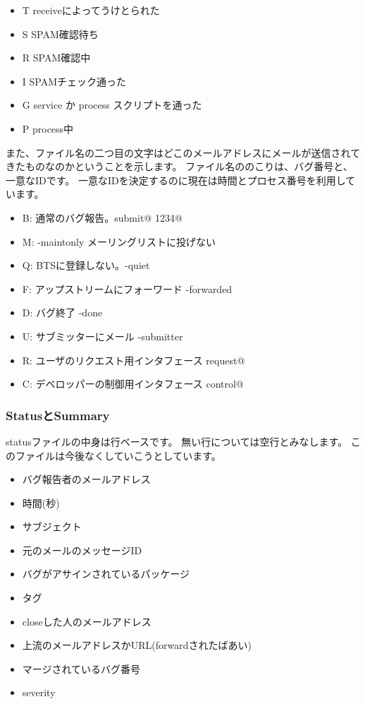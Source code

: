 \documentclass[mingoth,a4paper]{jsarticle}
\begin{document}
\begin{itemize}
 \item T receiveによってうけとられた
 \item S SPAM確認待ち
 \item R SPAM確認中
 \item I SPAMチェック通った
 \item G service か process スクリプトを通った
 \item P process中
\end{itemize}

また、ファイル名の二つ目の文字はどこのメールアドレスにメールが送信されて
きたものなのかということを示します。
ファイル名ののこりは、バグ番号と、一意なIDです。
一意なIDを決定するのに現在は時間とプロセス番号を利用しています。

\begin{itemize}
 \item B: 通常のバグ報告。submit@ 1234@
 \item M: -maintonly メーリングリストに投げない
 \item Q: BTSに登録しない。-quiet
 \item F: アップストリームにフォーワード -forwarded
 \item D: バグ終了 -done
 \item U: サブミッターにメール -submitter
 \item R: ユーザのリクエスト用インタフェース request@
 \item C: デベロッパーの制御用インタフェース control@
\end{itemize}

\subsubsection{StatusとSummary}

statusファイルの中身は行ベースです。
無い行については空行とみなします。
このファイルは今後なくしていこうとしています。

\begin{itemize}
 \item バグ報告者のメールアドレス
 \item 時間(秒)
 \item サブジェクト
 \item 元のメールのメッセージID
 \item バグがアサインされているパッケージ
 \item タグ
 \item closeした人のメールアドレス
 \item 上流のメールアドレスかURL(forwardされたばあい)
 \item マージされているバグ番号
 \item severity
\end{itemize}
\end{document}
